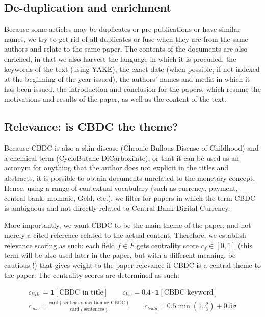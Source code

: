 \documentclass[11pt,a4paper]{article}
\begin{document}
\subsection{De-duplication and enrichment}

Because some articles may be duplicates or pre-publications or have similar names, we try to get rid
of all duplicates or fuse when they are from the same authors and relate to the same paper. The
contents of the documents are also enriched, in that we also harvest the language in which it is procuded,
the keywords of the text (using YAKE), the exact date (when possible, if not indexed at the beginning
of the year issued), the authors' names and media in which it has been issued, the introduction and
conclusion for the papers, which resume the motivations and results of the paper, as well as
the content of the text.


\subsection{Relevance: is CBDC the theme?}

Because CBDC is also a skin disease (Chronic Bullous Disease of Childhood) and a chemical term 
(CycloButane DiCarboxilate), or that it can be used as an acronym for anything that the author does not
explicit in the titles and abstracts, it is possible to obtain documents unrelated to the monetary concept.
Hence, using a range of contextual vocabulary (such as currency, payment, central bank, monnaie,
Geld, etc.), we filter for papers in which the term CBDC is ambiguous and not directly related to
Central Bank Digital Currency.

More importantly, we want CBDC to be the main theme of the paper, and not merely
a cited reference related to the actual content. Therefore, we establish relevance
scoring as such: each field $f \in F$ gets centrality score $c_f \in [0,1]$ (this term
will be also used later in the paper, but with a different meaning, be 
cautious !) that gives weight to the paper relevance if CBDC is a central
theme to the paper. The centrality scores are determined as such:

\begin{align*}
  c_{title} = \mathbf{1}[\text{CBDC in title}] \qquad 
  c_{kw} = 0.4 \cdot \mathbf{1}[\text{CBDC keyword}] \\
  c_{abs} = \frac{\text{card}(\text{sentences mentioning CBDC})}{\text{card}(\text{sentences})}
\qquad c_{body} = 0.5 \min \left(1, \frac{\rho}{3} \right) + 0.5
\sigma
\end{align*}
\end{document}
